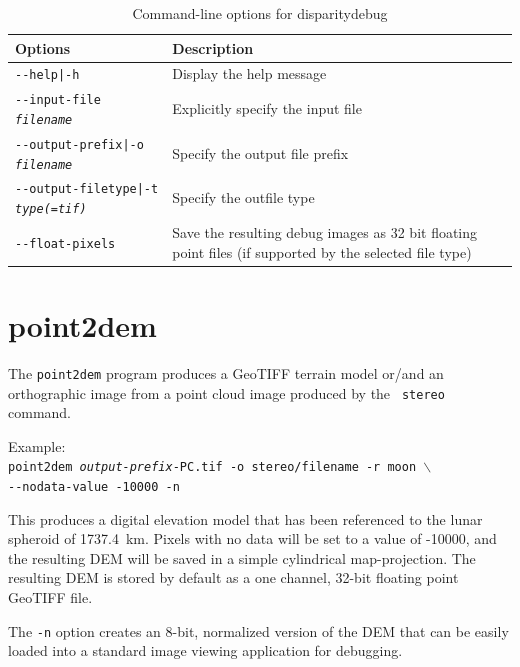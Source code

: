 \begin{longtable}{|l|p{10cm}|}
\caption{Command-line options for disparitydebug}
\label{tbl:disparitydebug}
\endfirsthead
\endhead
\endfoot
\endlastfoot
\hline
Options & Description \\ \hline \hline
\texttt{-\/-help|-h} & Display the help message\\ \hline
\texttt{-\/-input-file \textit{filename}} & Explicitly specify the input file \\ \hline
\texttt{-\/-output-prefix|-o \textit{filename}} & Specify the output file prefix \\ \hline
\texttt{-\/-output-filetype|-t \textit{type(=tif)}} & Specify the outfile type \\ \hline
\texttt{-\/-float-pixels} & Save the resulting debug images as 32 bit floating point files (if supported by the selected file type) \\ \hline
\end{longtable}


\section{point2dem}
\label{point2dem}

The \texttt{point2dem} program produces a GeoTIFF terrain model or/and
an orthographic image from a point cloud image produced by the {\tt
  stereo} command.

Example:\\
\hspace*{2em}\texttt{point2dem \textit{output-prefix}-PC.tif -o stereo/filename -r moon $\backslash$} \\
\hspace*{4em}\texttt{-\/-nodata-value -10000 -n}

This produces a digital elevation model that has been referenced to
the lunar spheroid of 1737.4~km.  Pixels with no data will be set to a
value of -10000, and the resulting \ac{DEM} will be saved in a simple
cylindrical map-projection.  The resulting \ac{DEM} is stored by default as
a one channel, 32-bit floating point GeoTIFF file.

The {\tt -n} option creates an 8-bit, normalized version of the DEM
that can be easily loaded into a standard image viewing application
for debugging.

